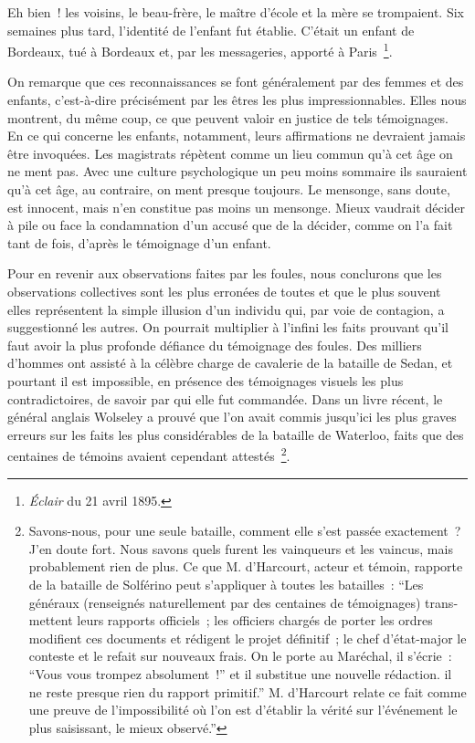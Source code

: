 \documentclass[french,twoside]{book} %
\begin{document}
Eh bien ! les voisins, le beau-frère, le maître d’école et la mère se trompaient. Six semaines plus tard, l’identité de l’enfant fut établie. C’était un enfant de Bordeaux, tué à Bordeaux et, par les messageries, apporté à Paris \footnote{\emph{Éclair} du 21 avril 1895.}.\par
On remarque que ces reconnaissances se font généralement par des femmes et des enfants, c’est-à-dire précisément par les êtres les plus impressionnables. Elles nous montrent, du même coup, ce que peuvent valoir en justice de tels témoignages. En ce qui concerne les enfants, notamment, leurs affirmations ne devraient jamais être invoquées. Les magistrats répètent comme un lieu commun qu’à cet âge on ne ment pas. Avec une culture psychologique un peu moins sommaire ils sauraient qu’à cet âge, au contraire, on ment presque toujours. Le mensonge, sans doute, est innocent, mais n’en constitue pas moins un mensonge. Mieux vaudrait décider à pile ou face la condamnation d’un accusé que de la décider, comme on l’a fait tant de fois, d’après le témoignage d’un enfant.\par
Pour en revenir aux observations faites par les foules, nous conclurons que les observations collectives sont les plus erronées de toutes et que le plus souvent elles représentent la simple illusion d’un individu qui, par voie de contagion, a sugges­tionné les autres. On pourrait multiplier à l’infini les faits prouvant qu’il faut avoir la plus profonde défiance du témoignage des foules. Des milliers d’hommes ont assisté à la célèbre charge de cavalerie de la bataille de Sedan, et pourtant il est impossible, en présence des témoignages visuels les plus contradictoires, de savoir par qui elle fut commandée. Dans un livre récent, le général anglais Wolseley a prouvé que l’on avait commis jusqu’ici les plus graves erreurs sur les faits les plus considérables de la bataille de Waterloo, faits que des centaines de témoins avaient cependant attestés \footnote{Savons-nous, pour une seule bataille, comment elle s’est passée exactement ? J’en doute fort. Nous savons quels furent les vainqueurs et les vaincus, mais probablement rien de plus. Ce que M. d’Harcourt, acteur et témoin, rapporte de la bataille de Solférino peut s’appliquer à toutes les batailles : “Les généraux (renseignés naturellement par des centaines de témoignages) trans­mettent leurs rapports officiels ; les officiers chargés de porter les ordres modifient ces documents et rédigent le projet définitif ; le chef d’état-major le conteste et le refait sur nouveaux frais. On le porte au Maréchal, il s’écrie : “Vous vous trompez absolument !” et il substitue une nouvelle rédaction. il ne reste presque rien du rapport primitif.” M. d’Harcourt relate ce fait comme une preuve de l’impossibilité où l’on est d’établir la vérité sur l’événement le plus saisissant, le mieux observé.”}.\par
\end{document}
